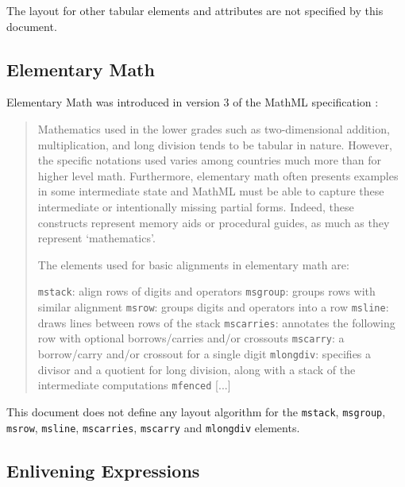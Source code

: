 The layout for other tabular elements and attributes are not specified by this
document.

\subsection{Elementary Math}

Elementary Math was introduced in version 3 of the MathML specification
\cite{MathML3}:

\begin{quote}
Mathematics used in the lower grades such as two-dimensional addition,
multiplication, and long division tends to be tabular in nature. However, the
specific notations used varies among countries much more than for higher level
math. Furthermore, elementary math often presents examples in some intermediate
state and MathML must be able to capture these intermediate or intentionally
missing partial forms. Indeed, these constructs represent memory aids or
procedural guides, as much as they represent ‘mathematics’.

The elements used for basic alignments in elementary math are:

{\tt mstack}: align rows of digits and operators
{\tt msgroup}: groups rows with similar alignment
{\tt msrow}: groups digits and operators into a row
{\tt msline}: draws lines between rows of the stack
{\tt mscarries}: annotates the following row with optional borrows/carries
and/or crossouts
{\tt mscarry}: a borrow/carry and/or crossout for a single digit
{\tt mlongdiv}: specifies a divisor and a quotient for long division, along
with a stack of the intermediate computations
{\tt mfenced}
[...]
\end{quote}

This document does not define any layout algorithm for the {\tt mstack},
{\tt msgroup}, {\tt msrow}, {\tt msline}, {\tt mscarries}, {\tt mscarry} and
{\tt mlongdiv} elements.

\subsection{Enlivening Expressions}\label{maction}

